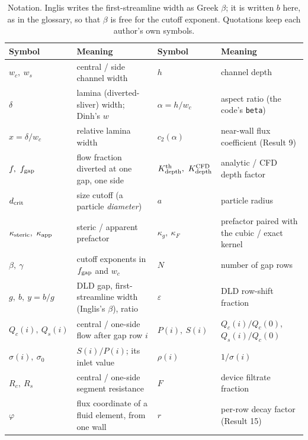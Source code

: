 \begin{table}[ht]
\centering
\small
\renewcommand{\arraystretch}{1.12}
\begin{tabular}{@{}lp{5.2cm}@{\hskip 1.2em}lp{5.2cm}@{}}
\toprule
Symbol & Meaning & Symbol & Meaning \\
\midrule
$w_c,\ w_s$ & central / side channel width & $h$ & channel depth \\
$\delta$ & lamina (diverted-sliver) width; Dinh's $w$ & $\alpha=h/w_c$ & aspect ratio (the code's \texttt{beta}) \\
$x=\delta/w_c$ & relative lamina width & $c_2(\alpha)$ & near-wall flux coefficient (Result 9) \\
$f,\ \fgap$ & flow fraction diverted at one gap, one side & $\Kdth,\ \Kdcfd$ & analytic / CFD depth factor \\
$d_{\mathrm{crit}}$ & size cutoff (a particle \emph{diameter}) & $a$ & particle radius \\
$\kster,\ \kapp$ & steric / apparent prefactor & $\kappa_g,\ \kappa_F$ & prefactor paired with the cubic / exact kernel \\
$\beta,\ \gamma$ & cutoff exponents in $f_{\mathrm{gap}}$ and $w_c$ & $N$ & number of gap rows \\
$g,\ b,\ y=b/g$ & DLD gap, first-streamline width (Inglis's $\beta$), ratio & $\varepsilon$ & DLD row-shift fraction \\
$Q_c(i),\ Q_s(i)$ & central / one-side flow after gap row $i$ & $P(i),\ S(i)$ & $Q_c(i)/Q_c(0)$, $Q_s(i)/Q_c(0)$ \\
$\sigma(i),\ \sigma_0$ & $S(i)/P(i)$; its inlet value & $\rho(i)$ & $1/\sigma(i)$ \\
$R_c,\ R_s$ & central / one-side segment resistance & $F$ & device filtrate fraction \\
$\varphi$ & flux coordinate of a fluid element, from one wall & $r$ & per-row decay factor (Result 15) \\
\bottomrule
\end{tabular}
\caption{Notation. Inglis writes the first-streamline width as Greek $\beta$; it is written
$b$ here, as in the glossary, so that $\beta$ is free for the cutoff exponent. Quotations
keep each author's own symbols.}
\label{tab:nomen}
\end{table}

